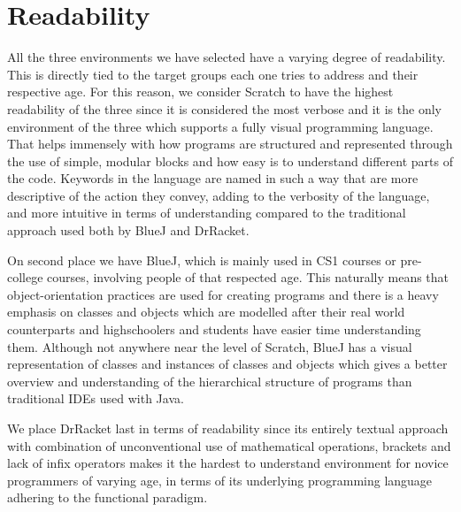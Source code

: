 \section{Readability}
\label{sec:readability}
All the three environments we have selected have a varying degree of readability. This is directly tied to the target groups each one tries to address and their respective age. For this reason, we consider Scratch to have the highest readability of the three since it is considered the most verbose and it is the only environment of the three which supports a fully visual programming language. That helps immensely with how programs are structured and represented through the use of simple, modular blocks and how easy is to understand different parts of the code. Keywords in the language are named in such a way that are more descriptive of the action they convey, adding to the verbosity of the language, and more intuitive in terms of understanding compared to the traditional approach used both by BlueJ and DrRacket. 

On second place we have BlueJ, which is mainly used in CS1 courses or pre-college courses, involving people of that respected age. This naturally means that object-orientation practices are used for creating programs and there is a heavy emphasis on classes and objects which are modelled after their real world counterparts and highschoolers and students have easier time understanding them. Although not anywhere near the level of Scratch, BlueJ has a visual representation of classes and instances of classes and objects which gives a better overview and understanding of the hierarchical structure of programs than traditional IDEs used with Java. 

We place DrRacket last in terms of readability since its entirely textual approach with combination of unconventional use of mathematical operations, brackets and lack of infix operators makes it the hardest to understand environment for novice programmers of varying age, in terms of its underlying programming language adhering to the functional paradigm.

